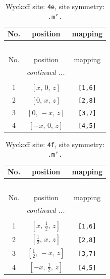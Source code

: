 \documentclass[fleqn,8pt]{jsarticle}
\begin{document}
\begin{longtable}{ccc}
\caption{Wyckoff site: {\tt 4e}, site symmetry: {\tt .m'.}}
 \\
 \hline \hline
No. & position & mapping \\ \hline \endfirsthead

\multicolumn{2}{l}{\tablename\ \thetable{}} \\
 \hline \hline
No. & position & mapping \\ \hline \endhead

 \hline \hline
\multicolumn{2}{r}{\footnotesize\it continued ...} \\ \endfoot

 \hline \hline
\multicolumn{2}{r}{} \\ \endlastfoot

1 & $\left[ x,\, 0,\, z \right]$ & {\tt [1,6]} \\ \hline
2 & $\left[ 0,\, x,\, z \right]$ & {\tt [2,8]} \\ \hline
3 & $\left[ 0,\, - x,\, z \right]$ & {\tt [3,7]} \\ \hline
4 & $\left[ - x,\, 0,\, z \right]$ & {\tt [4,5]} \\
\end{longtable}
\renewcommand{\arraystretch}{1.2}
\begin{longtable}{ccc}
\caption{Wyckoff site: {\tt 4f}, site symmetry: {\tt .m'.}}
 \\
 \hline \hline
No. & position & mapping \\ \hline \endfirsthead

\multicolumn{2}{l}{\tablename\ \thetable{}} \\
 \hline \hline
No. & position & mapping \\ \hline \endhead

 \hline \hline
\multicolumn{2}{r}{\footnotesize\it continued ...} \\ \endfoot

 \hline \hline
\multicolumn{2}{r}{} \\ \endlastfoot

1 & $\left[ x,\, \frac{1}{2},\, z \right]$ & {\tt [1,6]} \\ \hline
2 & $\left[ \frac{1}{2},\, x,\, z \right]$ & {\tt [2,8]} \\ \hline
3 & $\left[ \frac{1}{2},\, - x,\, z \right]$ & {\tt [3,7]} \\ \hline
4 & $\left[ - x,\, \frac{1}{2},\, z \right]$ & {\tt [4,5]} \\
\end{longtable}
\end{document}
